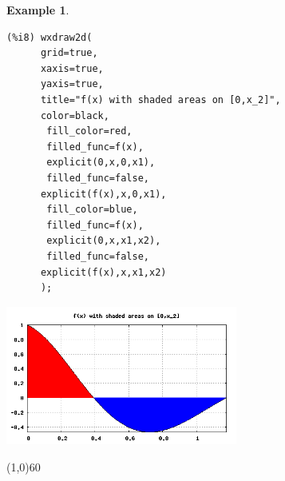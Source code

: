 \documentclass[10.5pt,twoside]{report}
\theoremstyle{definition}
\newtheorem{exmp}{Example}[section]
\begin{document}
\begin{exmp}
\begin{verbatim}
(%i8) wxdraw2d(
      grid=true,
      xaxis=true,
      yaxis=true,
      title="f(x) with shaded areas on [0,x_2]",
      color=black,
       fill_color=red,
       filled_func=f(x),
       explicit(0,x,0,x1),
       filled_func=false,
      explicit(f(x),x,0,x1),
       fill_color=blue,
       filled_func=f(x),
       explicit(0,x,x1,x2),
       filled_func=false,
      explicit(f(x),x,x1,x2)
      );
\end{verbatim}

\includegraphics[width=3in]{example_6_3_2_2}

\end{exmp}

\line(1,0){60}
\linethickness{0.5mm}
\end{document}

